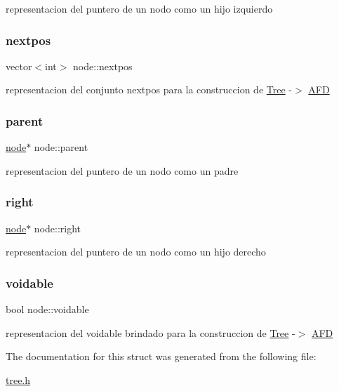 representacion del puntero de un nodo como un hijo izquierdo \hypertarget{structnode_a64dedca0efaaa687a5aef97070f82c74}{}\label{structnode_a64dedca0efaaa687a5aef97070f82c74} 
\subsubsection{\texorpdfstring{nextpos}{nextpos}}
{\footnotesize\ttfamily vector$<$int$>$ node\+::nextpos}

representacion del conjunto nextpos para la construccion de \hyperlink{class_tree}{Tree} -\/$>$ \hyperlink{class_a_f_d}{A\+FD} \hypertarget{structnode_a5e88137f1d0e2f7a940bccf4c3d3a4d3}{}\label{structnode_a5e88137f1d0e2f7a940bccf4c3d3a4d3} 
\subsubsection{\texorpdfstring{parent}{parent}}
{\footnotesize\ttfamily \hyperlink{structnode}{node}$\ast$ node\+::parent}

representacion del puntero de un nodo como un padre \hypertarget{structnode_abdc86d4c8604c481752953af3235fc47}{}\label{structnode_abdc86d4c8604c481752953af3235fc47} 
\subsubsection{\texorpdfstring{right}{right}}
{\footnotesize\ttfamily \hyperlink{structnode}{node}$\ast$ node\+::right}

representacion del puntero de un nodo como un hijo derecho \hypertarget{structnode_a660b4cccc7107b0f760220867e3bb582}{}\label{structnode_a660b4cccc7107b0f760220867e3bb582} 
\subsubsection{\texorpdfstring{voidable}{voidable}}
{\footnotesize\ttfamily bool node\+::voidable}

representacion del voidable brindado para la construccion de \hyperlink{class_tree}{Tree} -\/$>$ \hyperlink{class_a_f_d}{A\+FD} 

The documentation for this struct was generated from the following file\+:\begin{DoxyCompactItemize}
\item 
\hyperlink{tree_8h}{tree.\+h}\end{DoxyCompactItemize}
